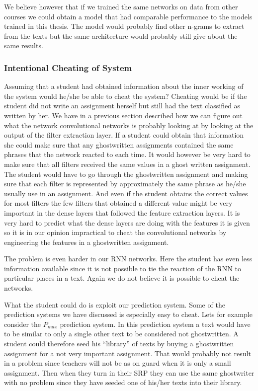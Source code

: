 We believe however that if we trained the same networks on data from other
courses we could obtain a model that had comparable performance to the models
trained in this thesis. The model would probably find other n-grams to extract
from the texts but the same architecture would probably still give about the
same results.


\subsubsection{Intentional Cheating of System}

Assuming that a student had obtained information about the inner working of
the system would he/she be able to cheat the system? Cheating would be if the
student did not write an assignment herself but still had the text classified
as written by her. We have in a previous section described how we can figure
out what the network convolutional networks is probably looking at by looking
at the output of the filter extraction layer. If a student could obtain that
information she could make sure that any ghostwritten assignments contained
the same phrases that the network reacted to each time. It would however be
very hard to make sure that all filters received the same values in a ghost
written assignment. The student would have to go through the ghostwritten
assignment and making sure that each filter is represented by approximately the
same phrase as he/she usually use in an assignment. And even if the student
obtains the correct values for most filters the few filters that obtained a
different value might be very important in the dense layers that followed the
feature extraction layers. It is very hard to predict what the dense layers
are doing with the features it is given so it is in our opinion impractical to
cheat the convolutional networks by engineering the features in a ghostwritten
assignment.

The problem is even harder in our \gls{RNN} networks. Here the student has even
less information available since it is not possible to tie the reaction of the
\gls{RNN} to particular places in a text. Again we do not believe it is possible
to cheat the networks.

What the student could do is exploit our prediction system. Some of the
prediction systems we have discussed is especially easy to cheat. Lets for
example consider the $P_{max}$ prediction system. In this prediction system a
text would have to be similar to only a single other text to be considered not
ghostwritten. A student could therefore seed his ``library'' of texts by buying
a ghostwritten assignment for a not very important assignment. That would
probably not result in a problem since teachers will not be as on guard when
it is only a small assignment. Then when they turn in their \gls{SRP} they can
use the same ghostwriter with no problem since they have seeded one of his/her
texts into their library.


